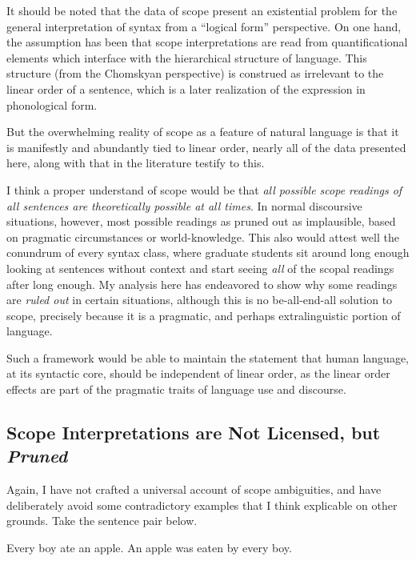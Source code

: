 \documentclass{article}
\begin{document}
It should be noted that the data of scope present an existential problem for the general interpretation of syntax from a ``logical form'' perspective. On one hand, the assumption has been that scope interpretations are read from quantificational elements which interface with the hierarchical structure of language. This structure (from the Chomskyan perspective) is construed as irrelevant to the linear order of a sentence, which is a later realization of the expression in phonological form.

But the overwhelming reality of scope as a feature of natural language is that it is manifestly and abundantly tied to linear order, nearly all of the data presented here, along with that in the literature testify to this.

I think a proper understand of scope would be that \emph{all possible scope readings of all sentences are theoretically possible at all times}. In normal discoursive situations, however, most possible readings as pruned out as implausible, based on pragmatic circumstances or world-knowledge. This also would attest well the conundrum of every syntax class, where graduate students sit around long enough looking at sentences without context and start seeing \emph{all} of the scopal readings after long enough. My analysis here has endeavored to show why some readings are \emph{ruled out} in certain situations, although this is no be-all-end-all solution to scope, precisely because it is a pragmatic, and perhaps extralinguistic portion of language.

Such a framework would be able to maintain the statement that human language, at its syntactic core, should be independent of linear order, as the linear order effects are part of the pragmatic traits of language use and discourse.

\subsection{Scope Interpretations are Not Licensed, but \emph{Pruned}}

Again, I have not crafted a universal account of scope ambiguities, and have deliberately avoid some contradictory examples that I think explicable on other grounds. Take the sentence pair below.

\begin{exe}
\ex Every boy ate an apple.\label{evboy}
\ex An apple was eaten by every boy.\label{anap}
\end{exe}
\end{document}
